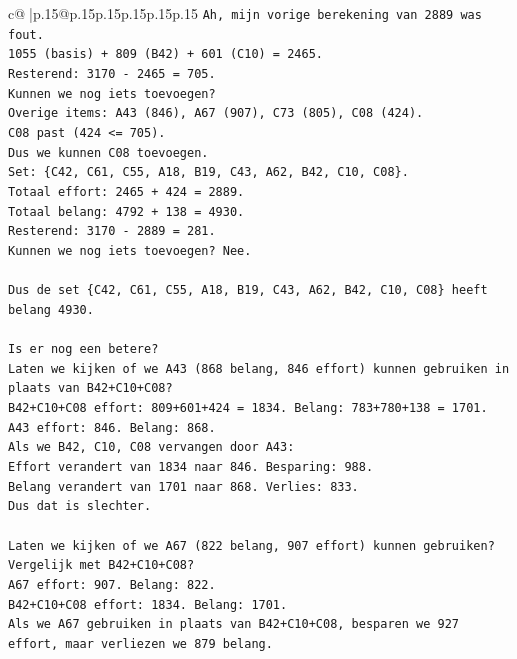 \documentclass{article}
\begin{document}
{\begin{supertabular}{c@{$\;$}|p{.15\linewidth}@{}p{.15\linewidth}p{.15\linewidth}p{.15\linewidth}p{.15\linewidth}p{.15\linewidth}}
{{{\texttt{Ah, mijn vorige berekening van 2889 was fout.} \\
\texttt{1055 (basis) + 809 (B42) + 601 (C10) = 2465.} \\
\texttt{Resterend: 3170 {-} 2465 = 705.} \\
\texttt{Kunnen we nog iets toevoegen?} \\
\texttt{Overige items: A43 (846), A67 (907), C73 (805), C08 (424).} \\
\texttt{C08 past (424 <= 705).} \\
\texttt{Dus we kunnen C08 toevoegen.} \\
\texttt{Set: \{C42, C61, C55, A18, B19, C43, A62, B42, C10, C08\}.} \\
\texttt{Totaal effort: 2465 + 424 = 2889.} \\
\texttt{Totaal belang: 4792 + 138 = 4930.} \\
\texttt{Resterend: 3170 {-} 2889 = 281.} \\
\texttt{Kunnen we nog iets toevoegen? Nee.} \\
\\ 
\texttt{Dus de set \{C42, C61, C55, A18, B19, C43, A62, B42, C10, C08\} heeft belang 4930.} \\
\\ 
\texttt{Is er nog een betere?} \\
\texttt{Laten we kijken of we A43 (868 belang, 846 effort) kunnen gebruiken in plaats van B42+C10+C08?} \\
\texttt{B42+C10+C08 effort: 809+601+424 = 1834. Belang: 783+780+138 = 1701.} \\
\texttt{A43 effort: 846. Belang: 868.} \\
\texttt{Als we B42, C10, C08 vervangen door A43:} \\
\texttt{Effort verandert van 1834 naar 846. Besparing: 988.} \\
\texttt{Belang verandert van 1701 naar 868. Verlies: 833.} \\
\texttt{Dus dat is slechter.} \\
\\ 
\texttt{Laten we kijken of we A67 (822 belang, 907 effort) kunnen gebruiken?} \\
\texttt{Vergelijk met B42+C10+C08?} \\
\texttt{A67 effort: 907. Belang: 822.} \\
\texttt{B42+C10+C08 effort: 1834. Belang: 1701.} \\
\texttt{Als we A67 gebruiken in plaats van B42+C10+C08, besparen we 927 effort, maar verliezen we 879 belang.} \\
}}}
\end{supertabular}}
\end{document}
